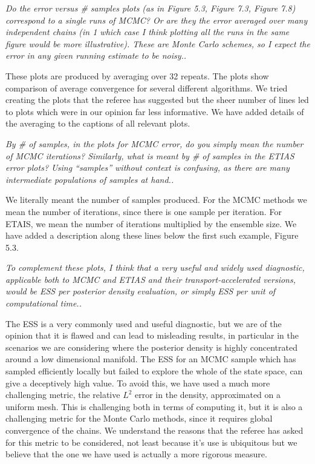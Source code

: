 \documentclass{article}
\newcommand{\comment}[2]{\vspace{0.6cm}{\bf Comment:} {\it #1.}

\vspace{0.3cm}{\bf Answer:} #2}
\begin{document}

\comment{Do the error versus \# samples plots (as in Figure 5.3, Figure 7.3, Figure 7.8) correspond to a single runs of MCMC? Or are they the error averaged over many independent chains (in
1
which case I think plotting all the runs in the same figure would be more illustrative). These are Monte Carlo schemes, so I expect the error in any given running estimate to be noisy.}{These plots are produced by averaging over 32 repeats. The plots show comparison of average convergence for several different algorithms. We tried creating the plots that the referee has suggested but the sheer number of lines led to plots which were in our opinion far less informative. We have added details of the averaging to the captions of all relevant plots.}


\comment{By \# of samples, in the plots for MCMC error, do you simply mean the number of MCMC iterations? Similarly, what is meant by \# of samples in the ETIAS error plots? Using “samples” without context is confusing, as there are many intermediate populations of samples at hand.}{We literally meant the number of samples produced. For the MCMC methods we mean the number of iterations, since there is one sample per iteration. For ETAIS, we mean the number of iterations multiplied by the ensemble size. We have added a description along these lines below the first such example, Figure 5.3.}


\comment{To complement these plots, I think that a very useful and widely used diagnostic, applicable both to MCMC and ETIAS and their transport-accelerated versions, would be ESS per posterior density evaluation, or simply ESS per unit of computational time.}{The ESS is a very commonly used and useful diagnostic, but we are of the opinion that it is flawed and can lead to misleading results, in particular in the scenarios we are considering where the posterior density is highly concentrated around a low dimensional manifold. The ESS for an MCMC sample which has sampled efficiently locally but failed to explore the whole of the state space, can give a deceptively high value. To avoid this, we have used a much more challenging metric, the relative $L^2$ error in the density, approximated on a uniform mesh. This is challenging both in terms of computing it, but it is also a challenging metric for the Monte Carlo methods, since it requires global convergence of the chains. We understand the reasons that the referee has asked for this metric to be considered, not least because it's use is ubiquitous but we believe that the one we have used is actually a more rigorous measure.}
\end{document}
